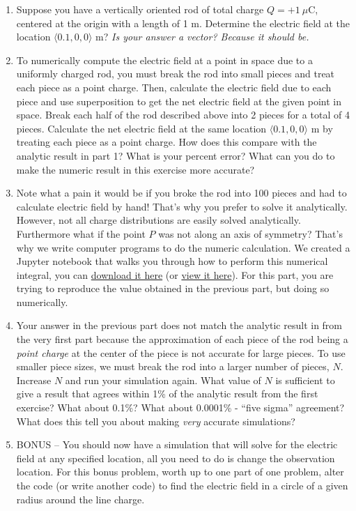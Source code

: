 \documentclass[11pt]{article}
\begin{document}
\begin{enumerate}
\def\labelenumi{\arabic{enumi}.}
\item
  Suppose you have a vertically oriented rod of total charge
  \(Q=+1\ \mu\)C, centered at the origin with a length of 1 m. Determine
  the electric field at the location \(\langle 0.1 , 0 , 0 \rangle\) m?
  \emph{Is your answer a vector? Because it should be.}
\item
  To numerically compute the electric field at a point in space due to a
  uniformly charged rod, you must break the rod into small pieces and
  treat each piece as a point charge. Then, calculate the electric field
  due to each piece and use superposition to get the net electric field
  at the given point in space. Break each half of the rod described
  above into 2 pieces for a total of 4 pieces. Calculate the net
  electric field at the same location \(\langle 0.1 , 0 , 0 \rangle\) m
  by treating each piece as a point charge. How does this compare with
  the analytic result in part 1? What is your percent error? What can
  you do to make the numeric result in this exercise more accurate?
\item
  Note what a pain it would be if you broke the rod into 100 pieces and
  had to calculate electric field by hand! That's why you prefer to
  solve it analytically. However, not all charge distributions are
  easily solved analytically. Furthermore what if the point \(P\) was
  not along an axis of symmetry? That's why we write computer programs
  to do the numeric calculation. We created a Jupyter notebook that
  walks you through how to perform this numerical integral, you can
  \href{../jupyter/HW2-ElectricFieldChargedRod.ipynb}{download it here}
  (or
  \href{https://github.com/dannycab/phy481msu/blob/gh-pages/jupyter/HW2-ElectricFieldChargedRod.ipynb}{view
  it here}). For this part, you are trying to reproduce the value
  obtained in the previous part, but doing so numerically.
\item
  Your answer in the previous part does not match the analytic result in
  from the very first part because the approximation of each piece of
  the rod being a \emph{point charge} at the center of the piece is not
  accurate for large pieces. To use smaller piece sizes, we must break
  the rod into a larger number of pieces, \(N\). Increase \(N\) and run
  your simulation again. What value of \(N\) is sufficient to give a
  result that agrees within 1\% of the analytic result from the first
  exercise? What about 0.1\%? What about 0.0001\% - ``five sigma''
  agreement? What does this tell you about making \emph{very} accurate
  simulations?
\item
  BONUS -- You should now have a simulation that will solve for the
  electric field at any specified location, all you need to do is change
  the observation location. For this bonus problem, worth up to one part
  of one problem, alter the code (or write another code) to find the
  electric field in a circle of a given radius around the line charge.
\end{enumerate}
\end{document}
